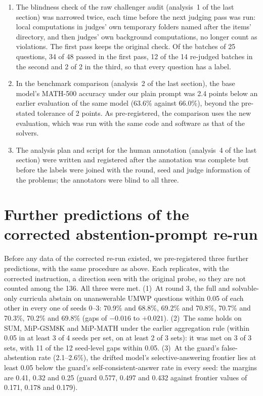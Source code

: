 \documentclass[10pt,a4paper]{article}
\begin{document}
\begin{enumerate}
\item The blindness check of the raw challenger audit (analysis~1 of the last section) was narrowed twice, each time before the next judging pass was run: local computations in judges' own temporary folders named after the items' directory, and then judges' own background computations, no longer count as violations. The first pass keeps the original check. Of the batches of 25 questions, 34 of 48 passed in the first pass, 12 of the 14 re-judged batches in the second and 2 of 2 in the third, so that every question has a label.
\item In the benchmark comparison (analysis~2 of the last section), the base model's MATH-500 accuracy under our plain prompt was 2.4 points below an earlier evaluation of the same model (63.6\% against 66.0\%), beyond the pre-stated tolerance of 2 points. As pre-registered, the comparison uses the new evaluation, which was run with the same code and software as that of the solvers.
\item The analysis plan and script for the human annotation (analysis~4 of the last section) were written and registered after the annotation was complete but before the labels were joined with the round, seed and judge information of the problems; the annotators were blind to all three.
\end{enumerate}

\section*{Further predictions of the corrected abstention-prompt re-run}

Before any data of the corrected re-run existed, we pre-registered three further predictions, with the same procedure as above. Each replicates, with the corrected instruction, a direction seen with the original probe, so they are not counted among the 136. All three were met. (1)~At round 3, the full and solvable-only curricula abstain on unanswerable UMWP questions within 0.05 of each other in every one of seeds 0--3: 70.9\% and 68.8\%, 69.2\% and 70.8\%, 70.7\% and 70.3\%, 70.2\% and 69.8\% (gaps of $-0.016$ to $+0.021$). (2)~The same holds on SUM, MiP-GSM8K and MiP-MATH under the earlier aggregation rule (within 0.05 in at least 3 of 4 seeds per set, on at least 2 of 3 sets): it was met on 3 of 3 sets, with 11 of the 12 seed-level gaps within 0.05. (3)~At the guard's false-abstention rate (2.1--2.6\%), the drifted model's selective-answering frontier lies at least 0.05 below the guard's self-consistent-answer rate in every seed: the margins are 0.41, 0.32 and 0.25 (guard 0.577, 0.497 and 0.432 against frontier values of 0.171, 0.178 and 0.179).
\end{document}
